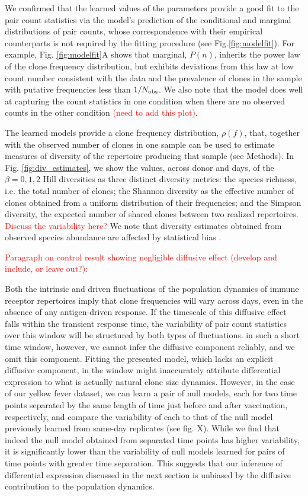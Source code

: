 \documentclass[letterpaper,english,prl,reprint,longbibliography]{revtex4-1} %
\begin{document}
We confirmed that the learned values of the parameters provide a good fit to the pair count statistics via the model's prediction of the conditional and marginal distributions of pair counts, whose correspondence with their empirical counterparts is not required by the fitting procedure (see Fig.\ref{fig:modelfit}). For example, Fig. \ref{fig:modelfit}A shows that marginal, $P(n)$, inherits the power law of the clone frequency distribution, but exhibits deviations from this law at low count number consistent with the data and the prevalence of clones in the sample with putative frequencies less than $1/N_{\textrm{\textrm{obs}}}$. We also note that the model does well at capturing the count statistics in one condition when there are no observed counts in the other condition \textcolor{red}{(need to add this plot)}.

The learned models provide a clone frequency distribution, $\rho(f)$, that, together with the observed number of clones in one sample can be used to estimate measures of diversity of the repertoire producing that sample (see Methods). In Fig. \ref{fig:div_estimates}, we show the values, across donor and days, of the $\beta=0,1,2$ Hill diversities as three distinct diversity metrics: the species richness, i.e. the total number of clones; the Shannon diversity as the effective number of clones obtained from a uniform distribution of their frequencies; and the Simpson diversity, the expected number of shared clones between two realized repertoires. \textcolor{red}{Discuss the variability here?} We note that diversity estimates obtained from observed species abundance are affected by statistical bias \citep{Mora2016}.

\textcolor{red}{Paragraph on control result showing negligible diffusive effect (develop and include, or leave out?):}

Both the intrinsic and driven fluctuations of the population dynamics of immune receptor repertoires imply that clone frequencies will vary across days, even in the absence of any antigen-driven response. 
If the timescale of this diffusive effect falls within the transient response time, the variability of pair count statistics over this window will be structured by both types of fluctuations. 
in such a short time window, however, we cannot infer the diffusive component reliably, and we omit this component.
Fitting the presented model, which lacks an explicit diffusive component, in the window might inaccurately attribute differential expression to what is actually natural clone size dynamics. 
However, in the case of our yellow fever dataset, we can learn a pair of null models, each for two time points separated by the same length of time just before and after vaccination, respectively, and compare the variability of each to that of the null model previously learned from same-day replicates (see fig. X). 
While we find that indeed the null model obtained from separated time points has higher variability, it is significantly lower than the variability of null models learned for pairs of time points with greater time separation. 
This suggests that our inference of differential expression discussed in the next section is unbiased by the diffusive contribution to the population dynamics. 
\end{document}

